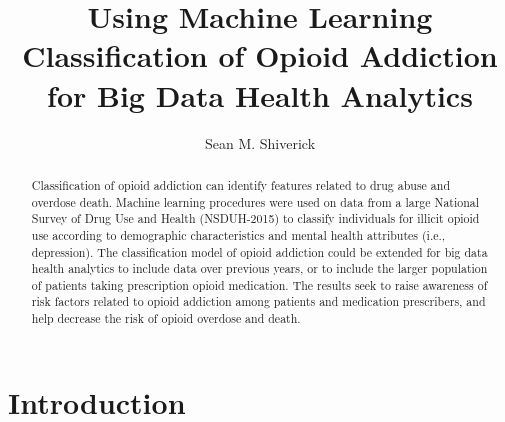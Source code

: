 \documentclass[sigconf]{acmart}
\begin{document}
\title{Using Machine Learning Classification of Opioid Addiction
for Big Data Health Analytics}

  \author{Sean M. Shiverick}

\renewcommand{\shortauthors}{S.M. Shiverick}


\begin{abstract}
Classification of opioid addiction can identify features related to drug abuse 
and overdose death. Machine learning procedures were used on data from a large 
National Survey of Drug Use and Health (NSDUH-2015) to classify individuals for 
illicit opioid use according to demographic characteristics and mental health 
attributes (i.e., depression). The classification model of opioid addiction 
could be extended for big data health analytics to include data over previous 
years, or to include the larger population of patients taking prescription 
opioid medication. The results seek to raise awareness of risk factors 
related to opioid addiction among patients and medication prescribers, and  
help decrease the risk of opioid overdose and death. 
\end{abstract}


\maketitle

\section{Introduction}
\end{document}
